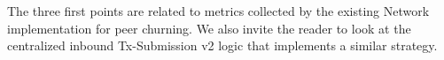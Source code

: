 The three first points are related to metrics collected by the existing Network implementation for peer churning. We also invite the reader to look at the centralized inbound Tx-Submission v2 logic that implements a similar strategy.






